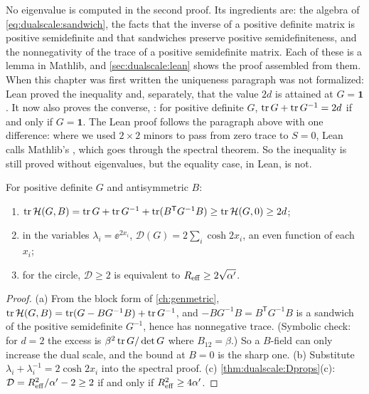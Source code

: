 No eigenvalue is computed in the second proof. Its ingredients are: the algebra of
\eqref{eq:dualscale:sandwich}, the facts that the inverse of a positive definite matrix is
positive semidefinite and that sandwiches preserve positive semidefiniteness, and the
nonnegativity of the trace of a positive semidefinite matrix. Each of these is a lemma in
Mathlib, and \cref{sec:dualscale:lean} shows the proof assembled from them. When this chapter
was first written the uniqueness paragraph was not formalized: Lean proved the inequality and,
separately, that the value $2d$ is attained at $G=\mathbf1$. It now also proves the converse,
: for positive definite $G$, $\operatorname{tr} G+\operatorname{tr} G^{-1}=2d$ if and only if
$G=\mathbf1$. The Lean proof follows the paragraph above with one difference: where we used
$2\times2$ minors to pass from zero trace to $S=0$, Lean calls Mathlib's
, which goes through the spectral theorem. So the
inequality is still proved without eigenvalues, but the equality case, in Lean, is not.

\begin{corollary}\label{thm:dualscale:corollaries}
For positive definite $G$ and antisymmetric $B$:
\begin{enumerate}[label=(\alph*),leftmargin=*]
\item $\operatorname{tr}\mathcal{H}(G,B)=\operatorname{tr} G+\operatorname{tr} G^{-1}+\operatorname{tr}(B^{\mathsf T}G^{-1}B)\ge\operatorname{tr}\mathcal{H}(G,0)\ge2d$;
\item in the variables $\lambda_i=\ee^{2x_i}$, $\mathcal D(G)=2\sum_i\cosh2x_i$, an even
 function of each $x_i$;
\item for the circle, $\mathcal D\ge2$ is equivalent to $R_{\rm eff}\ge2\sqrt{\alpha'}$.
\end{enumerate}
\end{corollary}
\begin{proof}
(a) From the block form of \cref{ch:genmetric}, $\operatorname{tr}\mathcal{H}(G,B)=\operatorname{tr}(G-BG^{-1}B)+\operatorname{tr} G^{-1}$, and
$-BG^{-1}B=B^{\mathsf T}G^{-1}B$ is a sandwich of the positive semidefinite $G^{-1}$, hence has
nonnegative trace. (Symbolic check: for $d=2$ the excess is $\beta^2\operatorname{tr} G/\det G$ where
$B_{12}=\beta$.) So a $B$-field can only increase the dual scale, and the bound at $B=0$ is the
sharp one. (b) Substitute $\lambda_i+\lambda_i^{-1}=2\cosh2x_i$ into the spectral proof.
(c) \cref{thm:dualscale:Dprops}(c): $\mathcal D=R_{\rm eff}^2/\alpha'-2\ge2$ if and only if
$R_{\rm eff}^2\ge4\alpha'$.
\end{proof}


